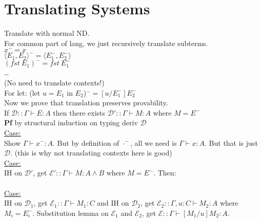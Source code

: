 \section{Translating Systems}
Translate  with normal ND.
\\ For common part of lang, we just recursively translate subterms.
\\ $x^- = x$
\\ $\langle E_1, E_2 \rangle^- = \langle E_1^-, E_2^- \rangle$
\\ $(fst\ E_1)^- = fst\ E_1^-$
\\ \ldots
\\ (No need to translate contexts!)
\\ For let: (let $u = E_1$ in $E_2$)$^-=[u/E_1^-]E_2^-$
\\ Now we prove that translation preserves provability.
\\ If $\mathcal{D} :: \Gamma \vdash E : A$ then there exists
$\mathcal{D}' :: \Gamma \vdash M : A$ where $M = E^-$
\\ \textbf{Pf} by structural induction on typing deriv $\mathcal{D}$
\\ \underline{Case:} 
\\ Show $\Gamma \vdash x^- : A$. But by definition of $\cdot^-$, all
we need is $\Gamma \vdash x :A$. But that is just $\mathcal{D}$. (this
is why not translating contexts here is good)
\\ \underline{Case:} 
\\ IH on $\mathcal{D}'$, get $\mathcal{E}' :: \Gamma \vdash M:A \land
B$ where $M = E^-$. Then:
\\ 
\\\underline{Case:}
\\ IH on $\mathcal{D}_1$, get $\mathcal{E}_1 :: \Gamma \vdash M_1 : C$
and IH on $\mathcal{D}_2$, get $\mathcal{E}_2 :: \Gamma, u : C \vdash
M_2 : A$ where $M_i = E_i^-$. Substitution lemma on $\mathcal{E}_1$
and $\mathcal{E}_2$, get $\mathcal{E} :: \Gamma \vdash [M_1/u]M_2 : A$.
\color{Magenta}
